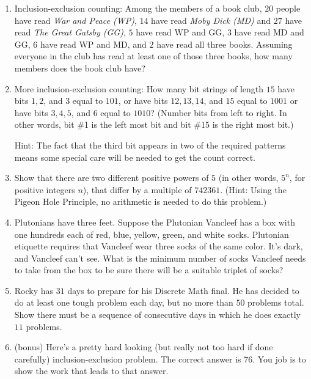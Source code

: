 \documentclass[11pt]{amsart}
\begin{document}
\begin{enumerate}

\item Inclusion{-}exclusion counting: Among the members of a book club,
 $20$ people have read {\itshape War and Peace (WP)}, $14$ have read
{\itshape Moby Dick (MD)} and  $27$ have read {\itshape The Great Gatsby (GG)}, $5$ have read WP and GG, $3$ have read MD and GG, $6$ have read WP and MD, and $2$ have read all three books. Assuming everyone in the club has read at least one of those three books, how many members does the book club have?  \\[5pt]

\item  More inclusion{-}exclusion counting: How many bit strings of length $15$ have bits $1,2$, and $3$  equal to $101$, or have bits $12,13,14$, and $15$ equal to $1001$ or
have bits $3,4,5$, and $6$ equal to $1010$? (Number bits from left to right. In other words, bit \#1 is the left most bit and bit \#15 is the right most bit.)

Hint: The fact that the third bit appears in two of the required patterns means some special care will be needed to get the count correct.\\[5pt]


\item  Show that there are two different positive powers of $5$ (in other words, $5^{n}$, for positive integers $n$),  that differ by a multiple of $742361$. (Hint: Using the Pigeon Hole Principle, no arithmetic is needed to do this problem.)\\[5pt]

\item Plutonians have three feet. Suppose the Plutonian Vancleef has a box with one hundreds each of red, blue, yellow, green, and white socks. Plutonian etiquette requires that Vancleef wear three socks of the same color.  It's dark, and Vancleef can't see. What is the minimum number of socks Vancleef needs to take from the box to be sure there will be a suitable triplet of socks?\\[5pt]

\item Rocky has $31$ days to prepare for his Discrete Math final. He has decided to do at least one tough problem each day, but no more than
$50$ problems total. Show there must be a sequence of consecutive days in which he does exactly $11$ problems.\\[5pt]

\item (bonus) Here's a pretty hard looking (but really not too hard if done carefully) inclusion{-}exclusion problem. The correct answer is $76$. You job is to show the work that leads to that answer.


\end{enumerate}
\end{document}
